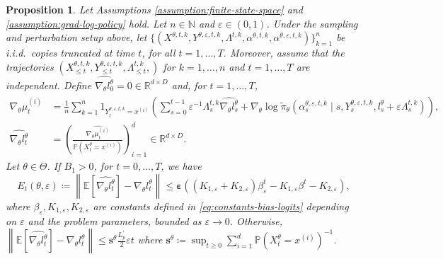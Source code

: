 \documentclass[11pt]{article}
\numberwithin{equation}{section}
\newtheorem{proposition}[theorem]{Proposition}
\theoremstyle{definition}
\theoremstyle{remark}
\def\eps{\varepsilon}
\def\N{{\mathbb{N}}}
\def\R{{\mathbb R}}
\begin{document}
\begin{proposition}
    \label{proposition:bias-state-distribution-gradient}
    Let Assumptions \ref{assumption:finite-state-space} and \ref{assumption:grad-log-policy} hold. 
    Let $n \in \N$ and $\eps \in (0,1)$. 
    Under the sampling and perturbation setup above, let
$\{(X^{\theta,t,k},Y^{\theta,\eps,t,k},\Lambda^{t,k}, \alpha^{\theta, t, k}, \alpha^{\theta, \eps,t ,k})\}_{k=1}^n$
be i.i.d.\ copies truncated at time $t$, for all $t = 1, \ldots, T$.
    Moreover, assume that the trajectories $ ( X^{\theta,t,k}_{\leq t}, Y^{\theta, \eps,t,k}_{\leq t}, \Lambda^{t,k}_{\leq t},)$ for $k=1,\ldots,n$ and $t = 1,\ldots,T$ are independent.
    Define $\widehat{\nabla_\theta l^\theta_0} = 0 \in \R^{d \times D}$ and, for $t = 1, \ldots, T$,
    \begin{equation}
        \label{eq:logit-gradient-estimator}
    \begin{aligned}
        \widehat{\nabla_{\theta} \mu_t^{(i)}} &= \frac{1}{n}\sum_{k = 1}^n 1_{Y^{\theta, \eps,t,k}_t = x^{(i)}}
        \left( \sum_{s = 0}^{t-1}  \eps^{-1} \Lambda_s^{t,k} \widehat{\nabla_\theta l^\theta_s} + \nabla_\theta \log \tilde \pi_\theta \left(\alpha_s^{\theta, \eps,t,k} \mid s, Y_s^{\theta, \eps,t,k}, l_s^\theta + \eps \Lambda_s^{t,k}\right) \right), \\
        \widehat{\nabla_\theta l^\theta_t} &= \left(\frac{\widehat{\nabla_{\theta} \mu_t^{(i)}}}{\mathbb P (X_t^\theta = x^{(i)})}\right)_{i = 1}^{d} \in \R^{d \times D}.
    \end{aligned}
\end{equation}
    Let $\theta \in \Theta$. If $B_1 > 0$, 
    for $t = 0, \ldots, T$, we have 
    \begin{equation}
        \label{eq:bias-logit-gradient-estimator}
        E_t(\theta, \eps) \coloneq \left\| \mathbb E \left[ \widehat{\nabla_\theta l_t^\theta} \right] - \nabla_\theta l_t^\theta \right\|
         \leq 
         \mathbf \eps \left((K_{1, \eps} + K_{2, \eps}) \beta_\eps^t - K_{1, \eps} \beta^t - K_{2, \eps} \right),
    \end{equation}
    where
    $\beta_\eps, K_{1, \eps},K_{2, \eps}$ are constants defined in \eqref{eq:constants-bias-logits} depending on $\eps$ and the problem parameters, bounded as $\eps \to 0$.
     Otherwise, $\left\| \mathbb E \left[ \widehat{\nabla_\theta l_t^\theta} \right] - \nabla_\theta l_t^\theta \right\| \leq \mathbf s^\theta \frac{L_p^\prime}{2} \eps t$ where $\mathbf s^\theta \coloneq \sup_{t \geq 0} \sum_{i=1}^d \mathbb P (X_t^\theta = x^{(i)})^{-1}$.
\end{proposition}
\end{document}
